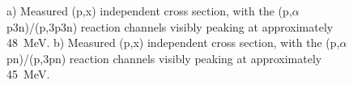 



\begin{figure}
    \centering
    \caption{a) Measured (p,x) independent cross section, with the (p,$\alpha$p3n)/(p,3p3n) reaction channels visibly peaking at approximately \mbox{48 MeV}.   b) Measured (p,x) independent cross section, with the (p,$\alpha$pn)/(p,3pn) reaction channels visibly peaking at approximately \mbox{45 MeV}.} 
     \label{fig:51Cr_ind}
\end{figure}




